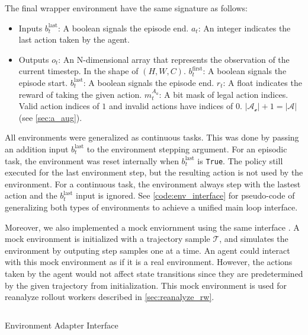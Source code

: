 \documentclass[12pt]{article}
\newcommand{\includecode}[2]{
\begin{listing}[H]
    \inputminted[frame=single, framesep=10pt, fontsize=\footnotesize]{python}{src/#1.py}
    \caption[]{#2}
    \label{code:#1}
\end{listing}   
}
\begin{document}
The final wrapper environment have the same signature as follows:
\begin{itemize}
    \item Inputs
          \subitem $b^{\text{last}}_{t}$: A boolean signals the episode end.
          \subitem $a_t$: An integer indicates the last action taken by the agent.
    \item Outputs
          \subitem $o_t$:
          An N-dimensional array that represents the observation of the current timestep.
          In the shape of $(H, W, C)$.
          \subitem $b^{\text{first}}_{t}$: A boolean signals the episode start.
          \subitem $b^{\text{last}}_{t}$: A boolean signals the episode end.
          \subitem $r_t$: A float indicates the reward of taking the given action.
          \subitem $m^{A_a}_t$: A bit mask of legal action indices. Valid
          action indices of $1$ and invalid actions have indices of $0$.
          $ | \mathcal{A_e} | + 1 = | \mathcal{A} | $ (see \ref{sec:a_aug}).
\end{itemize}

All environments were generalized as continuous tasks.
This was done by passing an addition input $b^\text{last}_t$ to the environment stepping argument.
For an episodic task, the environment was reset internally when $b^{\text{last}}_t$ is \Verb|True|.
The policy still executed for the last environment step, but the resulting action is not used by the environment.
For a continuous task, the environment always step with the lastest action and the $b^{\text{last}}_t$ input is ignored.
See \ref{code:env_interface} for pseudo-code of generalizing both types of environments to achieve a unified main loop interface.

Moreover, we also implemented a mock enviornment using the same interface \cite{MockObject__2021}.
A mock environment is initialized with a trajectory sample $\mathcal{T}$, and simulates the environment by outputing step samples one at a time.
An agent could interact with this mock environment as if it is a real environment.
However, the actions taken by the agent would not affect state transitions since they are predetermined by the given trajectory from initialization.
This mock environment is used for reanalyze rollout workers described in \ref{sec:reanalyze_rw}.

\includecode{env_interface}{Environment Adapter Interface}
\end{document}

